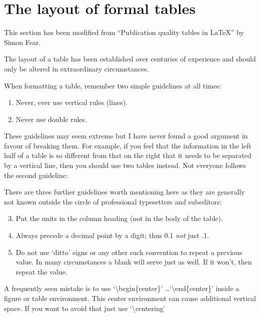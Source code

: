 \section{The layout of formal tables}
This section has been modified from ``Publication quality tables in \LaTeX*''
 by Simon Fear.

The layout of a table has been established over centuries of experience and 
should only be altered in extraordinary circumstances. 

When formatting a table, remember two simple guidelines at all times:

\begin{enumerate}
  \item Never, ever use vertical rules (lines).
  \item Never use double rules.
\end{enumerate}

These guidelines may seem extreme but I have
never found a good argument in favour of breaking them. For
example, if you feel that the information in the left half of
a table is so different from that on the right that it needs
to be separated by a vertical line, then you should use two
tables instead. Not everyone follows the second guideline:

There are three further guidelines worth mentioning here as they
are generally not known outside the circle of professional
typesetters and subeditors:

\begin{enumerate}\setcounter{enumi}{2}
  \item Put the units in the column heading (not in the body of
          the table).
  \item Always precede a decimal point by a digit; thus 0.1
      {\em not} just .1.
  \item Do not use `ditto' signs or any other such convention to
      repeat a previous value. In many circumstances a blank
      will serve just as well. If it won't, then repeat the value.
\end{enumerate}

A frequently seen mistake is to use `\textbackslash begin\{center\}' \dots `\textbackslash end\{center\}' inside a figure or table environment. This center environment can cause additional vertical space. If you want to avoid that just use `\textbackslash centering'



